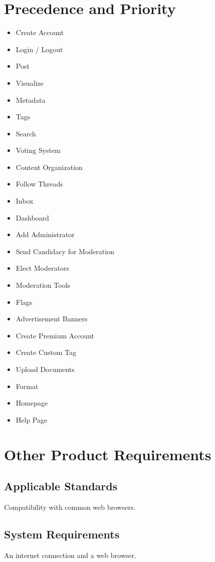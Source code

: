\documentclass [a4paper, 11pt]{article}
\begin{document}
\section{Precedence and Priority}
\begin{itemize}
		\item Create Account
		\item Login / Logout
		\item Post
		\item Visualize
		\item Metadata
		\item Tags
		\item Search
		\item Voting System
		\item Content Organization
		\item Follow Threads
		\item Inbox
		\item Dashboard
		\item Add Administrator
		\item Send Candidacy for Moderation
		\item Elect Moderators
		\item Moderation Tools
		\item Flags
		\item Advertisement Banners
		\item Create Premium Account
		\item Create Custom Tag
		\item Upload Documents
		\item Format
		\item Homepage
		\item Help Page
\end{itemize}



\section{Other Product Requirements}
\subsection{Applicable Standards}
Compatibility with common web browsers.

\subsection{System Requirements}
An internet connection and a web browser.
\end{document}
